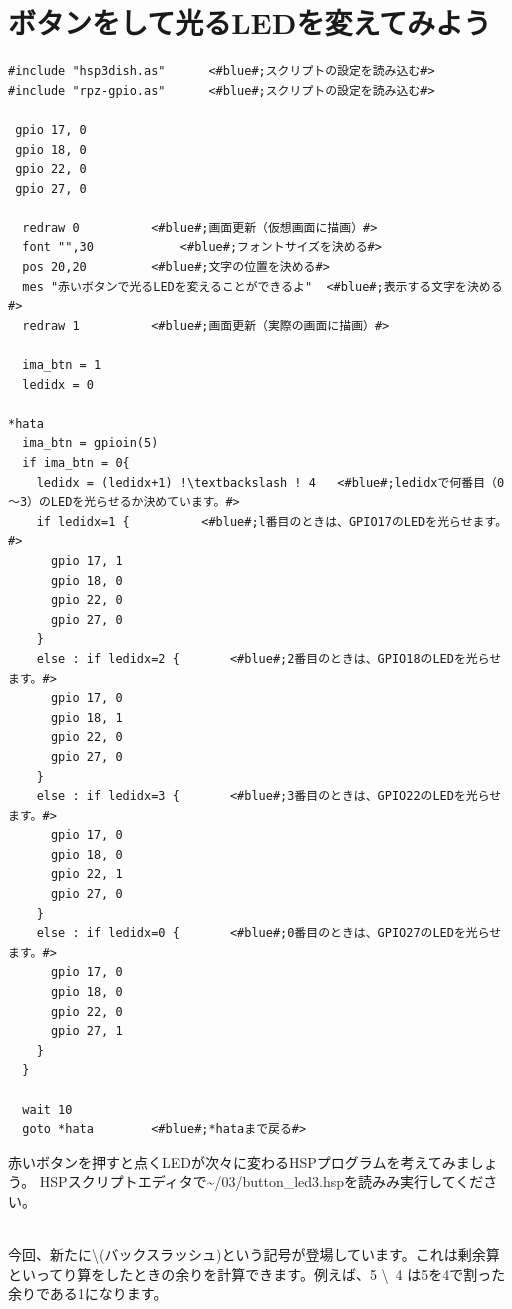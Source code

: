 \documentclass[text03.tex]{subfiles}
\begin{document}
\newpage
\section{ボタンをして光るLEDを変えてみよう}
\begin{lstlisting}[escapechar=!,caption=\textasciitilde/03/button\_led3.hsp,label=button_led3.hsp]
#include "hsp3dish.as"		<#blue#;スクリプトの設定を読み込む#>
#include "rpz-gpio.as"		<#blue#;スクリプトの設定を読み込む#>

 gpio 17, 0
 gpio 18, 0
 gpio 22, 0
 gpio 27, 0
	
  redraw 0			<#blue#;画面更新（仮想画面に描画）#>
  font "",30			<#blue#;フォントサイズを決める#>
  pos 20,20			<#blue#;文字の位置を決める#>
  mes "赤いボタンで光るLEDを変えることができるよ"	<#blue#;表示する文字を決める#>
  redraw 1			<#blue#;画面更新（実際の画面に描画）#>

  ima_btn = 1
  ledidx = 0

*hata
  ima_btn = gpioin(5)
  if ima_btn = 0{
    ledidx = (ledidx+1) !\textbackslash ! 4	  <#blue#;ledidxで何番目（0～3）のLEDを光らせるか決めています。#>
    if ledidx=1 {		   <#blue#;l番目のときは、GPIO17のLEDを光らせます。#>
      gpio 17, 1
      gpio 18, 0
      gpio 22, 0
      gpio 27, 0
    }
    else : if ledidx=2 {	   <#blue#;2番目のときは、GPIO18のLEDを光らせます。#>
      gpio 17, 0
      gpio 18, 1
      gpio 22, 0
      gpio 27, 0
    }
    else : if ledidx=3 {	   <#blue#;3番目のときは、GPIO22のLEDを光らせます。#>
      gpio 17, 0
      gpio 18, 0
      gpio 22, 1
      gpio 27, 0
    }
    else : if ledidx=0 {	   <#blue#;0番目のときは、GPIO27のLEDを光らせます。#>
      gpio 17, 0
      gpio 18, 0
      gpio 22, 0
      gpio 27, 1
    }
  }

  wait 10
  goto *hata		<#blue#;*hataまで戻る#>
\end{lstlisting}

赤いボタンを押すと点くLEDが次々に変わるHSPプログラムを考えてみましょう。
HSPスクリプトエディタで\textasciitilde/03/button\_led3.hspを読みみ実行してください。

\noindent \textbf{}\\
今回、新たに\textbackslash (バックスラッシュ)という記号が登場しています。これは剰余算といってり算をしたときの余りを計算できます。例えば、5 \textbackslash \ 4 は5を4で割った余りである1になります。
\end{document}

